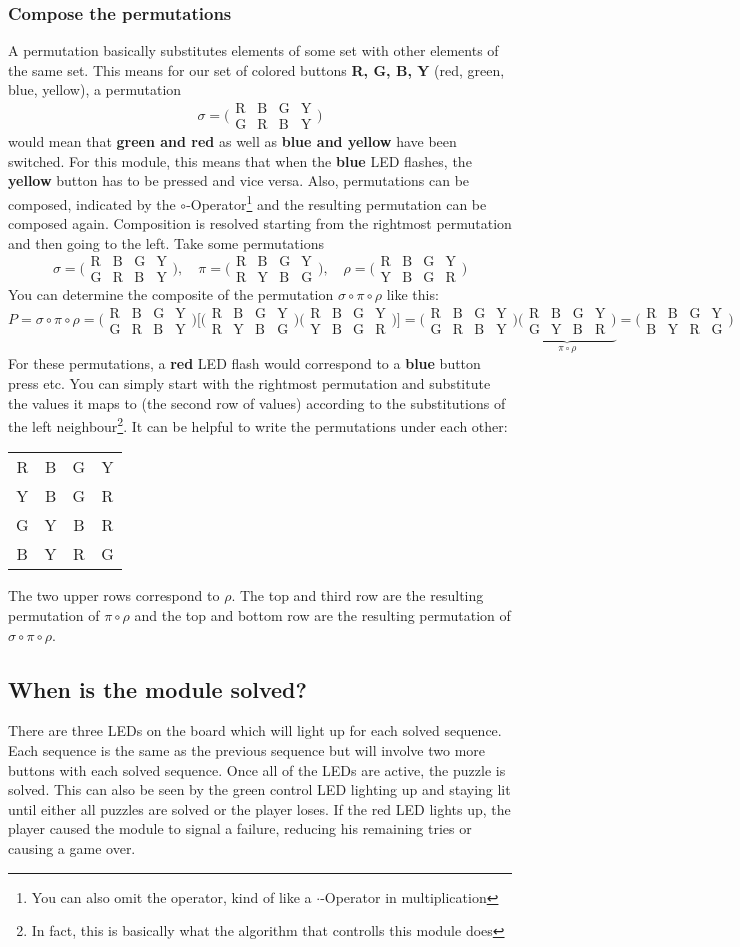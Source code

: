 \documentclass[a4paper]{article}
\newcommand{\perm}[4]{
	\bigl(\begin{smallmatrix}
		\mbox{R} & \mbox{B} & \mbox{G} & \mbox{Y} \\
		\mbox{#1}&\mbox{#2}&\mbox{#3}&\mbox{#4}
	\end{smallmatrix}\bigr)
}
\begin{document}
\subsubsection*{Compose the permutations}
A permutation basically substitutes elements of some set with other elements of the same set. This means for our set of colored buttons \textbf{R, G, B, Y} (red, green, blue, yellow), 
a permutation
\[
	\sigma = \perm{G}{R}{B}{Y}
\]
would mean that \textbf{green and red} as well as \textbf{blue and yellow} have been switched. For this module, this means that when the \textbf{blue} LED flashes, the \textbf{yellow}
button has to be pressed and vice versa. Also, permutations can be composed, indicated by the $\circ$-Operator\footnote{You can also omit the operator, kind of like a $\cdot$-Operator in multiplication} and the resulting permutation can be composed again. Composition is resolved starting from the rightmost permutation and then going to the left. Take some permutations
\[
	\sigma = \perm{G}{R}{B}{Y},\quad \pi = \perm{R}{Y}{B}{G}, \quad \rho  =\perm{Y}{B}{G}{R}
\]
You can determine the composite of the permutation $\sigma\circ\pi\circ\rho$ like this:
\[
	P=\sigma\circ\pi\circ\rho=\perm{G}{R}{B}{Y}\bigl[\perm{R}{Y}{B}{G}\perm{Y}{B}{G}{R}\bigr]=\perm{G}{R}{B}{Y}\underbrace{\perm{G}{Y}{B}{R}}_{\pi\circ\rho}=
		\perm{B}{Y}{R}{G}
\]
For these permutations, a \textbf{red} LED flash would correspond to a \textbf{blue} button press etc. You can simply start with the rightmost permutation and substitute the values it maps 
to (the second row of values) according to the substitutions of the left neighbour\footnote{In fact, this is basically what the algorithm that controlls this module does}. It can be helpful to write the permutations under each other:
\begin{table}[h]
\centering
\def\arraystretch{2}
 \begin{tabular}{cccc}
 R & B & G & Y \\
 Y & B & G & R \\
 G & Y & B & R \\
 B & Y & R & G
 \end{tabular}
 \end{table}

\noindent
The two upper rows correspond to $\rho$. The top and third row are the resulting permutation of $\pi\circ\rho$ and the top and bottom row are the resulting permutation of $\sigma\circ\pi\circ\rho$. 

\subsection*{When is the module solved?}
There are three LEDs on the board which will light up for each solved sequence. Each sequence is the same as the previous sequence but will involve two more buttons with each solved sequence. Once all of the LEDs are active, the puzzle is solved. This can also be seen by the green control LED lighting up and staying lit until either all puzzles are solved or the player loses.
If the red LED lights up, the player caused the module to signal a failure, reducing his remaining tries or causing a game over.
\end{document}
